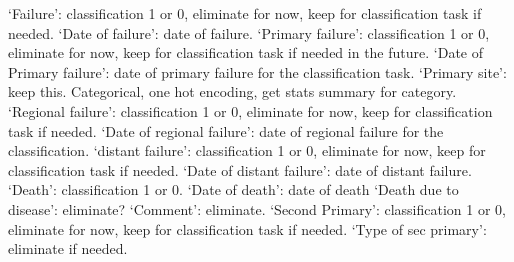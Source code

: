 \documentclass{article}%
\begin{document}
\newline%
\newline%
%
‘Failure’: classification 1 or 0, eliminate for now, keep for classification task if needed. %
\newline%
\newline%
%
‘Date of failure’: date of failure.%
\newline%
\newline%
%
‘Primary failure’: classification 1 or 0, eliminate for now, keep for classification task if needed in the future. %
\newline%
\newline%
%
‘Date of Primary failure’: date of primary failure for the classification task. %
\newline%
\newline%
%
‘Primary site’: keep this. Categorical, one hot encoding, get stats summary for category. %
\newline%
\newline%
%
‘Regional failure’: classification 1 or 0, eliminate for now, keep for classification task if needed. %
\newline%
\newline%
%
‘Date of regional failure’: date of regional failure for the classification. %
\newline%
\newline%
%
‘distant failure’: classification 1 or 0, eliminate for now, keep for classification task if needed.%
\newline%
\newline%
%
‘Date of distant failure’: date of distant failure.%
\newline%
\newline%
%
‘Death’: classification 1 or 0. %
\newline%
\newline%
%
‘Date of death’: date of death%
\newline%
\newline%
%
‘Death due to disease’: eliminate? %
\newline%
\newline%
%
‘Comment’: eliminate.%
\newline%
\newline%
%
‘Second Primary’: classification 1 or 0, eliminate for now, keep for classification task if needed. %
\newline%
\newline%
%
‘Type of sec primary’: eliminate if needed.%
\newline%
\end{document}

